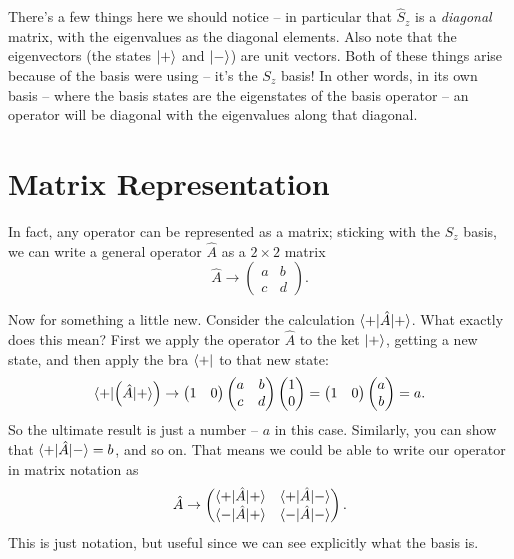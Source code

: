 There's a few things here we should notice -- in particular that $\hat{S}_z$ is a \emph{diagonal} matrix, with the eigenvalues as the diagonal elements.  Also note that the eigenvectors (the states $| + \rangle$ and $| - \rangle$) are unit vectors.  Both of these things arise because of the basis were using -- it's the $S_z$ basis!  In other words, in its own basis -- where the basis states are the eigenstates of the basis operator -- an operator will be diagonal with the eigenvalues along that diagonal.

\section{Matrix Representation}

In fact, any operator can be represented as a matrix; sticking with the $S_z$ basis, we can write a general operator $\hat{A}$ as a $2 \times 2$ matrix
\begin{equation}
\hat{A} \to \begin{pmatrix} a & b \\ c & d \end{pmatrix}.
\end{equation}

Now for something a little new.  Consider the calculation $\langle + | \hat{A} | + \rangle$.  What exactly does this mean?  First we apply the operator $\hat{A}$ to the ket $| + \rangle$, getting a new state, and then apply the bra $\langle + |$ to that new state:
\[
\langle + | \Big( \hat{A} | + \rangle \Big) \to \begin{pmatrix} 1 & 0 \end{pmatrix} \begin{pmatrix} a & b \\ c & d \end{pmatrix} \begin{pmatrix} 1 \\ 0 \end{pmatrix} = \begin{pmatrix} 1 & 0 \end{pmatrix} \begin{pmatrix} a \\ b \end{pmatrix} = a.
\]
So the ultimate result is just a number -- $a$ in this case.  Similarly, you can show that $\langle + |\hat{A} | - \rangle = b$, and so on.  That means we could be able to write our operator in matrix notation as
\begin{equation}
\label{eq_matrix_spin}
\hat{A} \to \begin{pmatrix} \langle + |\hat{A}| + \rangle & \langle + |\hat{A}| - \rangle \\ \langle - |\hat{A}| + \rangle & \langle - |\hat{A}| - \rangle \end{pmatrix}.
\end{equation}
This is just notation, but useful since we can see explicitly what the basis is.

